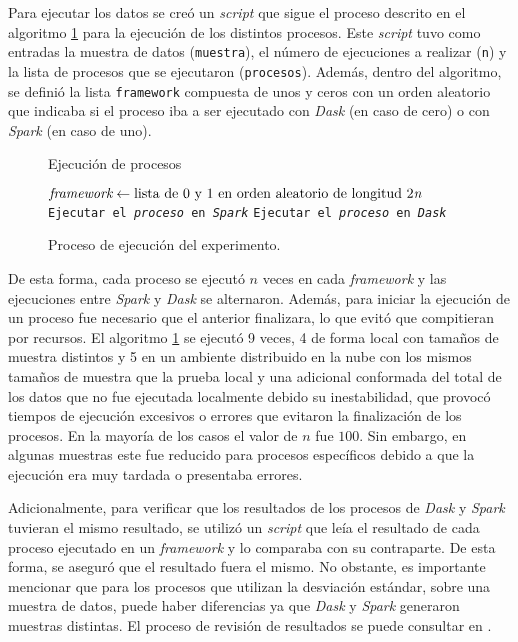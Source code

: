 Para ejecutar los datos se creó un \textit{script} que sigue el proceso descrito en el algoritmo \ref{ejecucion_procesos} para la ejecución de los distintos procesos. Este \textit{script} tuvo como entradas la muestra de datos (\texttt{muestra}), el número de ejecuciones a realizar (\texttt{n}) y la lista de procesos que se ejecutaron (\texttt{procesos}). Además, dentro del algoritmo, se definió la lista \texttt{framework} compuesta de unos y ceros con un orden aleatorio que indicaba si el proceso iba a ser ejecutado con \textit{Dask} (en caso de cero) o con \textit{Spark} (en caso de uno). 

\begin{figure}
\begin{algoritmo}[H]
\caption{Ejecución de procesos}\label{ejecucion_procesos}
\begin{algorithmic}[1]
	\State $\textit{framework} \gets \text{lista de 0 y 1 en orden aleatorio de longitud 2\textit{n}}$
		\State \texttt{Ejecutar el \textit{proceso} en \textit{Spark}}
		\Else
		\State \texttt{Ejecutar el \textit{proceso} en \textit{Dask}}
		\EndIf
	\EndFor
\EndFor
\EndProcedure
\end{algorithmic}
\end{algoritmo}
\caption{Proceso de ejecución del experimento.}
\end{figure}

De esta forma, cada proceso se ejecutó $n$ veces en cada \textit{framework} y las ejecuciones entre \textit{Spark} y \textit{Dask} se alternaron. Además, para iniciar la ejecución de un proceso fue necesario que el anterior finalizara, lo que evitó que compitieran por recursos. El algoritmo \ref{ejecucion_procesos} se ejecutó 9 veces, 4 de forma local con tamaños de muestra distintos y 5 en un ambiente distribuido en la nube con los mismos tamaños de muestra que la prueba local y una adicional conformada del total de los datos que no fue ejecutada localmente debido su inestabilidad, que provocó tiempos de ejecución excesivos o errores que evitaron la finalización de los procesos. En la mayoría de los casos el valor de $n$ fue $100$. Sin embargo, en algunas muestras este fue reducido para procesos específicos debido a que la ejecución era muy tardada o presentaba errores.

Adicionalmente, para verificar que los resultados de los procesos de \textit{Dask} y \textit{Spark} tuvieran el mismo resultado, se utilizó un \textit{script} que leía el resultado de cada proceso ejecutado en un \textit{framework} y lo comparaba con su contraparte. De esta forma, se aseguró que el resultado fuera el mismo. No obstante, es importante mencionar que para los procesos que utilizan la desviación estándar, sobre una muestra de datos, puede haber diferencias ya que \textit{Dask} y \textit{Spark} generaron muestras distintas. El proceso de revisión de resultados se puede consultar en \cite{compara-resultados}.

